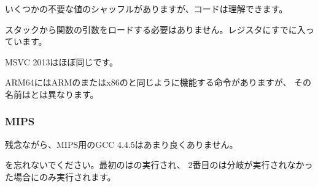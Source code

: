 

いくつかの不要な値のシャッフルがありますが、コードは理解できます。




スタックから関数の引数をロードする必要はありません。レジスタにすでに入っています。



MSVC 2013はほぼ同じです。


ARM64にはARMのまたはx86のと同じように機能する命令がありますが、
その名前はとは異なります。



\subsubsection{MIPS}

残念ながら、MIPS用のGCC 4.4.5はあまり良くありません。



を忘れないでください。最初のはの実行され、
2番目のは分岐が実行されなかった場合にのみ実行されます。
